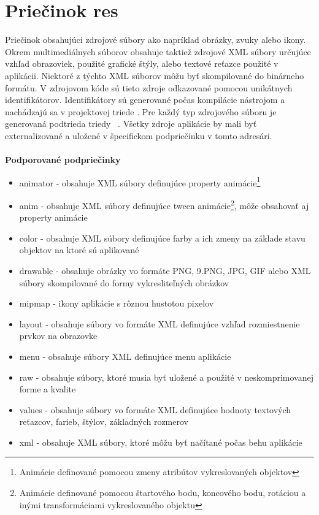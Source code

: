 \section{Priečinok res}
\label{res}
Priečinok obsahujúci zdrojové súbory ako napríklad obrázky, zvuky alebo ikony. Okrem multimediálnych súborov obsahuje taktiež zdrojové XML súbory určujúce vzhľad obrazoviek, použité grafické štýly, alebo textové reťazce použité v aplikácii. Niektoré z týchto XML súborov môžu byť skompilované do binárneho formátu. V zdrojovom kóde sú tieto zdroje odkazované pomocou unikátnych identifikátorov. Identifikátory sú generované počas kompilácie nástrojom  a nachádzajú sa v projektovej triede . Pre každý typ zdrojového súboru je generovaná podtrieda triedy ~\cite{accessingRes}. Všetky zdroje aplikácie by mali byť externalizované a uložené v špecifickom podpriečinku v tomto adresári. \\\\
\textbf{Podporované podpriečinky}~\cite{providingRes}
\begin{itemize}
\item animator - obsahuje XML súbory definujúce property animácie\footnote{Animácie definované pomocou zmeny atribútov vykreslovaných objektov}
\item anim - obsahuje XML súbory definujúce tween animácie\footnote{Animácie definované pomocou štartového bodu, koncového bodu, rotáciou a inými transformáciami vykreslovaného objektu}, môže obsahovať aj property animácie
\item color - obsahuje XML súbory definujúce farby a ich zmeny na základe stavu objektov na ktoré sú aplikované
\item drawable - obsahuje obrázky vo formáte PNG, 9.PNG, JPG, GIF alebo XML súbory skompilované do formy vykresliteľných obrázkov
\item mipmap - ikony aplikácie s rôznou hustotou pixelov
\item layout - obsahuje súbory vo formáte XML definujúce vzhľad rozmiestnenie prvkov na obrazovke
\item menu - obsahuje súbory XML definujúce menu aplikácie
\item raw - obsahuje súbory, ktoré musia byť uložené a použité v neskomprimovanej forme a kvalite
\item values - obsahuje súbory vo formáte XML definujúce hodnoty textových reťazcov, farieb, štýlov, základných rozmerov
\item xml - obsahuje XML súbory, ktoré môžu byť načítané počas behu aplikácie
\end{itemize}

